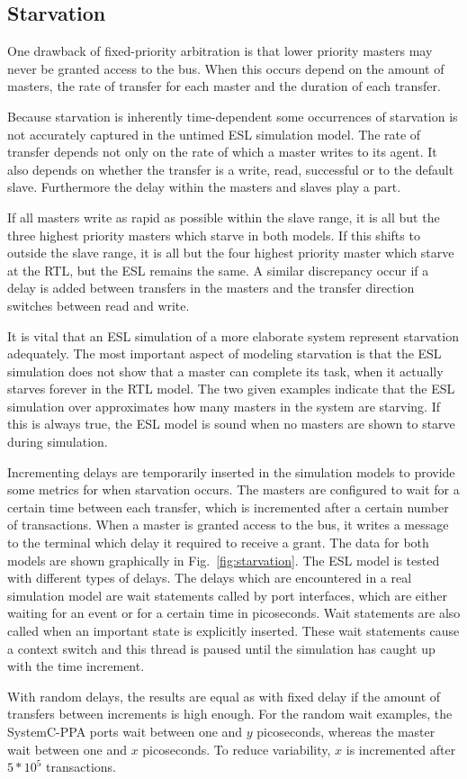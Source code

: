 \subsection{Starvation}
\label{sub:starvation}
One drawback of fixed-priority arbitration is that lower priority masters may never be granted access to the bus. When this occurs depend on the amount of masters, the rate of transfer for each master and the duration of each transfer. \par
Because starvation is inherently time-dependent some occurrences of starvation is not accurately captured in the untimed ESL simulation model. The rate of transfer depends not only on the rate of which a master writes to its agent. It also depends on whether the transfer is a write, read, successful or to the default slave. Furthermore the delay within the masters and slaves play a part. \par
If all masters write as rapid as possible within the slave range, it is all but the three highest priority masters which starve in both models. If this shifts to outside the slave range, it is all but the four highest priority master which starve at the RTL, but the ESL remains the same. A similar discrepancy occur if a delay is added between transfers in the masters and the transfer direction switches between read and write. \par
It is vital that an ESL simulation of a more elaborate system represent starvation adequately. The most important aspect of modeling starvation is that the ESL simulation does not show that a master can complete its task, when it actually starves forever in the RTL model. The two given examples indicate that the ESL simulation over approximates how many masters in the system are starving. If this is always true, the ESL model is sound when no masters are shown to starve during simulation. \par
Incrementing delays are temporarily inserted in the simulation models to provide some metrics for when starvation occurs. The masters are configured to wait for a certain time between each transfer, which is incremented after a certain number of transactions. When a master is granted access to the bus, it writes a message to the terminal which delay it required to receive a grant. The data for both models are shown graphically in Fig.~\ref{fig:starvation}. The ESL model is tested with different types of delays. The delays which are encountered in a real simulation model are wait statements called by port interfaces, which are either waiting for an event or for a certain time in picoseconds. Wait statements are also called when an important state is explicitly inserted. These wait statements cause a context switch and this thread is paused until the simulation has caught up with the time increment. \par
With random delays, the results are equal as with fixed delay if the amount of transfers between increments is high enough. For the random wait examples, the SystemC-PPA ports wait between one and $y$ picoseconds, whereas the master wait between one and $x$ picoseconds. To reduce variability, $x$ is incremented after $5*10^5$ transactions.      

